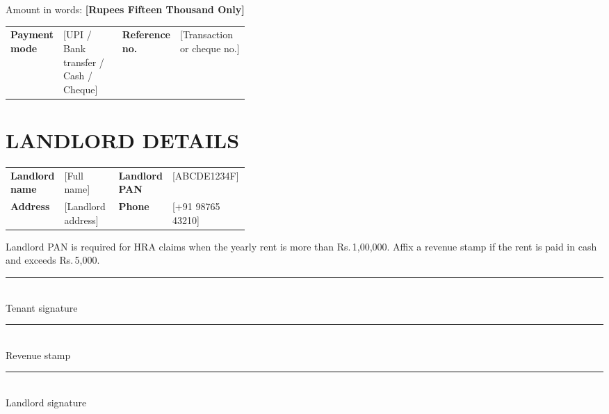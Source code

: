 \documentclass[10pt]{article}
\begin{document}
\par

\vspace{4pt}

Amount in words: \textbf{[Rupees Fifteen Thousand Only]}\par\vspace{4pt}

\begin{tabularx}{\linewidth}{@{}p{0.2\linewidth}X p{0.2\linewidth}X@{}}
\textbf{Payment mode} & [UPI / Bank transfer / Cash / Cheque] & \textbf{Reference no.} & [Transaction or cheque no.] \\
\end{tabularx}\par\vspace{2pt}

\section{LANDLORD DETAILS}

\begin{tabularx}{\linewidth}{@{}p{0.2\linewidth}X p{0.2\linewidth}X@{}}
\textbf{Landlord name} & [Full name] & \textbf{Landlord PAN} & [ABCDE1234F] \\
\textbf{Address} & [Landlord address] & \textbf{Phone} & [+91 98765 43210] \\
\end{tabularx}\par\vspace{2pt}

Landlord PAN is required for HRA claims when the yearly rent is more than Rs.\,1,00,000. Affix a revenue stamp if the rent is paid in cash and exceeds Rs.\,5,000.\par\vspace{4pt}

\vspace{32pt}\noindent\parbox[t]{0.3\linewidth}{\centering\rule{\linewidth}{0.5pt}\\ Tenant signature}\hfill\parbox[t]{0.3\linewidth}{\centering\rule{\linewidth}{0.5pt}\\ Revenue stamp}\hfill\parbox[t]{0.3\linewidth}{\centering\rule{\linewidth}{0.5pt}\\ Landlord signature}\par
\end{document}
